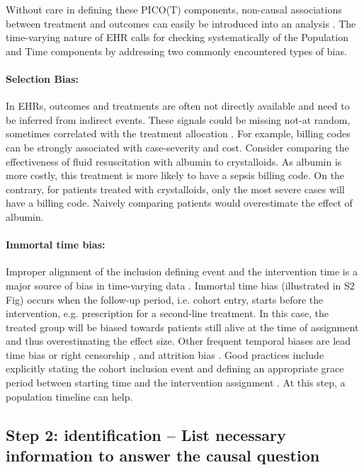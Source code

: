 \documentclass[10pt,letterpaper]{article}
\begin{document}
Without care in defining these PICO(T) components, non-causal associations
between treatment and outcomes can easily be introduced into an analysis
\cite{catalogofbias}. The time-varying nature of EHR calls for checking
systematically of the Population and Time components by addressing two commonly
encountered types of bias.


\paragraph{Selection Bias:} In EHRs, outcomes and treatments are often not
directly available and need to be inferred from indirect events. These signals
could be missing not-at random, sometimes correlated with the treatment
allocation \cite{weiskopf2023healthcare}. For example, billing codes can be
strongly associated with case-severity and cost. Consider comparing the
effectiveness of fluid resuscitation with albumin to crystalloids. As albumin is
more costly, this treatment is more likely to have a sepsis billing code. On the
contrary, for patients treated with crystalloids, only the most severe cases
will have a billing code. Naively comparing patients would overestimate the
effect of albumin.

\paragraph{Immortal time bias:} Improper alignment of the inclusion defining
event and the intervention time is a major source of bias in time-varying data
\cite{suissa2008immortal,hernan2016specifying,wang2022understanding}. Immortal time bias (illustrated in S2 Fig) occurs when the follow-up period,
i.e. cohort entry, starts before the intervention, e.g. prescription for a
second-line treatment. In this case, the treated group will be biased towards
patients still alive at the time of assignment and thus overestimating the
effect size. Other frequent temporal biases are lead time bias
\cite{Oke2021leadtimebias,fu2021timing} or right censorship  \cite{hernan2016specifying}, and attrition bias
\cite{Bankhead2017attritionbias}. Good
practices include explicitly stating the cohort inclusion event   \cite[Chapter~10:Defining Cohorts]{ohdsi2019book} and defining
an appropriate grace period between starting time and the intervention
assignment \cite{hernan2016specifying}. At this step, a population timeline can
help.


\subsection*{Step 2: identification -- List necessary information to answer the causal question}\label{sec:identification}
\end{document}
